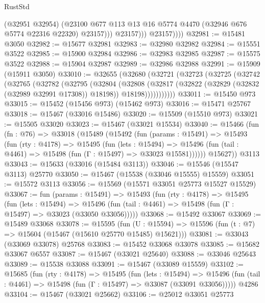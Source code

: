 \begin{lexlean}{RustStd}
\begin{coremodule}
                      (@32951 @32954)
                      (@23100
                        @677
                        @113
                        @13
                        @16
                        @5774
                        @4470
                        (@32946 @676 @5774 @22316 @22320)
                        @23157)))
                  @23157)))
            @23157))))
@32981 := @15481 @3050
@32982 := @15677 @32981
@32983 := @32980 @32982
@32984 := @15551 @3522
@32985 := @15900 @32984
@32986 := @32983 @32985
@32987 := @15575 @3522
@32988 := @15904 @32987
@32989 := @32986 @32988
@32991 := @15909 (@15911 @3050)
@33010 := @32655
    (@32680
      (@32721
        (@32723
          (@32725
            (@32742
              (@32765
                (@32782
                  (@32795
                    (@32804
                      (@32808
                        (@32817
                          (@32822 (@32829 (@32832 (@32989 @32991 @17308)) @18198))
                          @18198)))))))))))
@33011 := @15450 @973
@33015 := @15452 (@15456 @973) (@15462 @973)
@33016 := @15471 @25767
@33018 := @15467 (@33016 @15486)
@33020 := @15509 (@15510 @973)
@33021 := @15505 @33020
@33023 := @15467 (@33021 @15534)
@33040 := @15466
    (fun (fn : @76) =>
    @33018
      (@15489
        (@15492
          (fun (params : @15491) =>
          @15493
            (fun (rty : @4178) =>
            @15495
              (fun (lets : @15494) =>
              @15496 (fun (tail : @4461) => @15498 (fun (Γ : @15497) => @33023 @15581))))))
        @15627))
    @3113
@33043 := @15633 (@33016 (@15484 @3113))
@33046 := @15546 (@15547 @3113) @25770
@33050 := @15467 (@15538 (@33046 @15555) @15559)
@33051 := @15572 @3113
@33056 := @15569 (@15571 @33051 @25773 @15527 @15529)
@33067 := fun (params : @15491) =>
  @15493
    (fun (rty : @4178) =>
    @15495
      (fun (lets : @15494) =>
      @15496 (fun (tail : @4461) => @15498 (fun (Γ : @15497) => @33023 (@33050 @33056)))))
@33068 := @15492 @33067
@33069 := @15489 @33068
@33078 := @15595
    (fun (U : @15594) => @15596 (fun (t : @7) => @15604 (@15467 (@15610 @25770 @15485) @15621)))
@33081 := @33043 (@33069 @33078) @25768
@33083 := @15452 @33068 @33078
@33085 := @15682 @33067 @6557
@33087 := @15467 (@33021 @25640)
@33088 := @33046 @25643
@33089 := @15538 @33088
@33091 := @15467 (@33089 @15559)
@33102 := @15685
    (fun (rty : @4178) =>
    @15495
      (fun (lets : @15494) =>
      @15496 (fun (tail : @4461) => @15498 (fun (Γ : @15497) => @33087 (@33091 @33056)))))
    @4286
@33104 := @15467 (@33021 @25662)
@33106 := @25012 @33051 @25773

\end{coremodule}
\end{lexlean}
